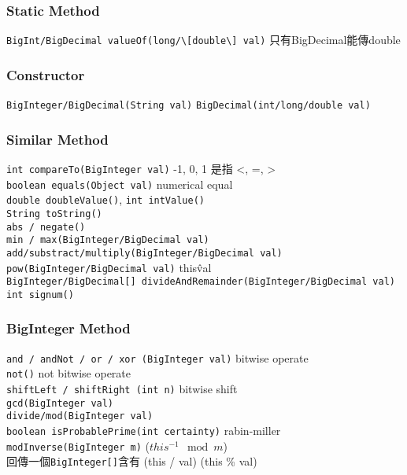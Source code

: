     \subsubsection{Static Method}
        \lstinline{BigInt/BigDecimal valueOf(long/\[double\] val)} 只有BigDecimal能傳double

    \subsubsection{Constructor}
        \lstinline{BigInteger/BigDecimal(String val)}
        \lstinline{BigDecimal(int/long/double val)}

    \subsubsection{Similar Method}
        \lstinline{int compareTo(BigInteger val)} -1, 0, 1 是指 <, =, >\\
        \lstinline{boolean equals(Object val)} numerical equal\\
        \lstinline{double doubleValue()}, \lstinline{int intValue()}\\
        \lstinline{String toString()}\\
        \lstinline{abs / negate()}\\
        \lstinline{min / max(BigInteger/BigDecimal val)}\\
        \lstinline{add/substract/multiply(BigInteger/BigDecimal val)}\\
        \lstinline{pow(BigInteger/BigDecimal val)} this\^val\\
        \lstinline{BigInteger/BigDecimal[] divideAndRemainder(BigInteger/BigDecimal val)}\\
        \lstinline{int signum()}\\

    \subsubsection{BigInteger Method}
        \lstinline{and / andNot / or / xor (BigInteger val)} bitwise operate\\
        \lstinline{not()} not bitwise operate\\
        \lstinline{shiftLeft / shiftRight (int n)} bitwise shift\\
        \lstinline{gcd(BigInteger val)}\\
        \lstinline{divide/mod(BigInteger val)}\\
        \lstinline{boolean isProbablePrime(int certainty)} rabin-miller\\
        \lstinline{modInverse(BigInteger m)} ($this^{-1} \mod m$)\\
        回傳一個\lstinline{BigInteger[]}含有 (this / val) (this \% val)\\\
        
